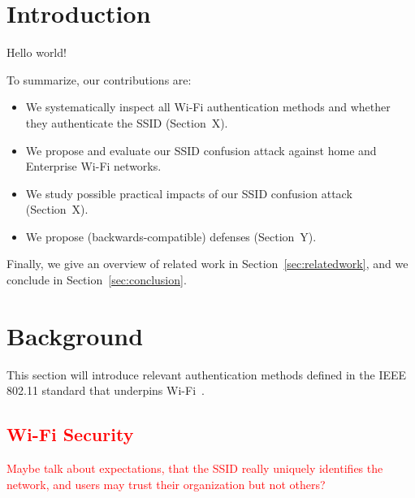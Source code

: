 \documentclass[sigconf,review]{acmart}
\newcommand{\wifi}{\mbox{Wi-Fi}}
\DeclareRobustCommand{\red}[1]{\textcolor{red}{#1}}
\begin{document}
\maketitle

\section{Introduction}

Hello world!

To summarize, our contributions are:
\begin{itemize}
    \item We systematically inspect all \wifi{} authentication methods and whether they authenticate the SSID (Section~X).

    \item We propose and evaluate our SSID confusion attack against home and Enterprise \wifi{} networks.

	\item We study possible practical impacts of our SSID confusion attack (Section~X).
	
	\item We propose (backwards-compatible) defenses (Section~Y).
\end{itemize}
Finally, we give an overview of related work in Section~\ref{sec:relatedwork}, and we conclude in Section~\ref{sec:conclusion}.


\section{Background}

This section will introduce relevant authentication methods defined in the IEEE 802.11 standard that underpins \wifi{}~\cite{ieee80211-2020}.

\subsection{\red{\wifi{} Security}}

\red{Maybe talk about expectations, that the SSID really uniquely identifies the network, and users may trust their organization but not others?}
\end{document}
